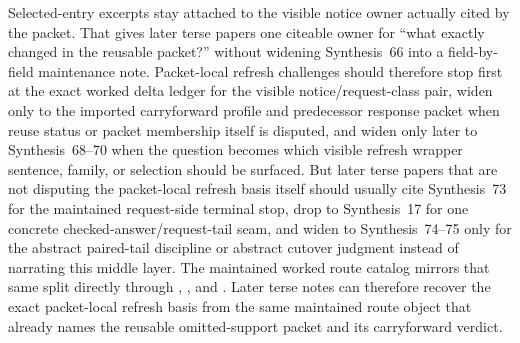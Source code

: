 \documentclass[11pt]{article}
\begin{document}
Selected-entry excerpts stay attached to the visible notice owner actually cited by the packet. That gives later terse papers one citeable owner for ``what exactly changed in the reusable packet?'' without widening Synthesis~66 into a field-by-field maintenance note. Packet-local refresh challenges should therefore stop first at the exact worked delta ledger for the visible notice/request-class pair, widen only to the imported carryforward profile and predecessor response packet when reuse status or packet membership itself is disputed, and widen only later to Synthesis~68--70 when the question becomes which visible refresh wrapper sentence, family, or selection should be surfaced. But later terse papers that are not disputing the packet-local refresh basis itself should usually cite Synthesis~73 for the maintained request-side terminal stop, drop to Synthesis~17 for one concrete checked-answer/request-tail seam, and widen to Synthesis~74--75 only for the abstract paired-tail discipline or abstract cutover judgment instead of narrating this middle layer. The maintained worked route catalog mirrors that same split directly through , , and . Later terse notes can therefore recover the exact packet-local refresh basis from the same maintained route object that already names the reusable omitted-support packet and its carryforward verdict.
\end{document}
